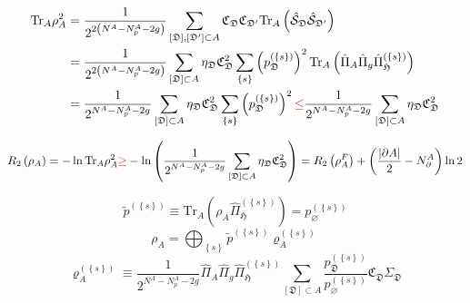 \documentclass[12font]{article}
\theoremstyle{definition}
\newcommand{\lr}[1]{\left(  #1  \right)}
\newcommand{\lrg}[1]{\left\{  #1  \right\}}
\newcommand{\abs}[1]{\left|  #1  \right|}
\newcommand{\de}{\partial}
\newcommand{\mrm}[1]{\mathrm{#1}}
\newcommand{\alert}[1]{{\color{red}#1}}
\newcommand{\Tr}{\mrm{Tr}}
\begin{document}
\begin{align*}
    \Tr_A\rho_A^2
    &=
    \frac{1}{2^{2\lr{N^A-N^A_p-2g}}}
    \sum_{[\mathfrak{D}],[\mathfrak{D}']\subset A} \mathfrak{C}_\mathfrak{D} \mathfrak{C}_{\mathfrak{D}'} \Tr_A\lr{\hat{\mathcal{S}}_\mathfrak{D} \hat{\mathcal{S}}_{\mathfrak{D}'}} \\
    &=
    \frac{1}{2^{2\lr{N^A-N^A_p-2g}}}
    \sum_{[\mathfrak{D}]\subset A} 
    \eta_\mathfrak{D} \mathfrak{C}^2_\mathfrak{D} 
    \sum_{\lrg{s}} 
    \lr{p^{(\lrg{s})}_\mathfrak{D}}^2
    \Tr_A\lr{
    \hat{\Pi}_A\hat{\Pi}_g\hat{\Pi}_\mathfrak{H}^{(\lrg{s})}
    } \\
    &=
    \frac{1}{2^{N^A-N^A_p-2g}}
    \sum_{[\mathfrak{D}]\subset A} 
    \eta_\mathfrak{D} \mathfrak{C}^2_\mathfrak{D} 
    \sum_{\lrg{s}} \lr{p^{(\lrg{s})}_\mathfrak{D}}^2
    \alert{\leq} 
    \frac{1}{2^{N^A-N^A_p-2g}}
    \sum_{[\mathfrak{D}]\subset A} 
    \eta_\mathfrak{D} \mathfrak{C}^2_\mathfrak{D} 
\end{align*}

\begin{equation}\label{eq:increasing-renyi-entropy}
    R_2\lr{\rho_A} = -\ln\Tr_A\rho_A^2 
    \alert{\geq} 
    -\ln\lr{
        \frac{1}{2^{N^A-N^A_p-2g}}
        \sum_{[\mathfrak{D}]\subset A} 
        \eta_\mathfrak{D} \mathfrak{C}^2_\mathfrak{D}
    }
    = 
    R_2\lr{\rho_A^F} + \lr{\frac{\abs{\de A}}{2} - N^A_\de} \ln2
\end{equation}

\begin{equation}
    \tilde{p}^{(\lrg{s})} 
    \equiv
    \Tr_A\lr{\rho_A \hat{\Pi}_\mathfrak{H}^{(\lrg{s})}}
    =
    p_\varnothing^{(\lrg{s})}
\end{equation}
\begin{equation}
    \rho_A
    =
    \bigoplus_{\lrg{s}} \tilde{p}^{(\lrg{s})} \varrho^{(\lrg{s})}_A
\end{equation}
\[
\varrho^{(\lrg{s})}_A
\equiv
\frac{1}{2^{N^A-N^A_p-2g}} 
\hat{\Pi}_A \hat{\Pi}_g \hat{\Pi}_\mathfrak{H}^{(\lrg{s})}
\sum_{[\mathfrak{D}]\subset A} 
\frac{p_\mathfrak{D}^{(\lrg{s})}}{p_\varnothing^{(\lrg{s})}}
\mathfrak{C}_\mathfrak{D}
\Sigma_\mathfrak{D}
\]
\end{document}
